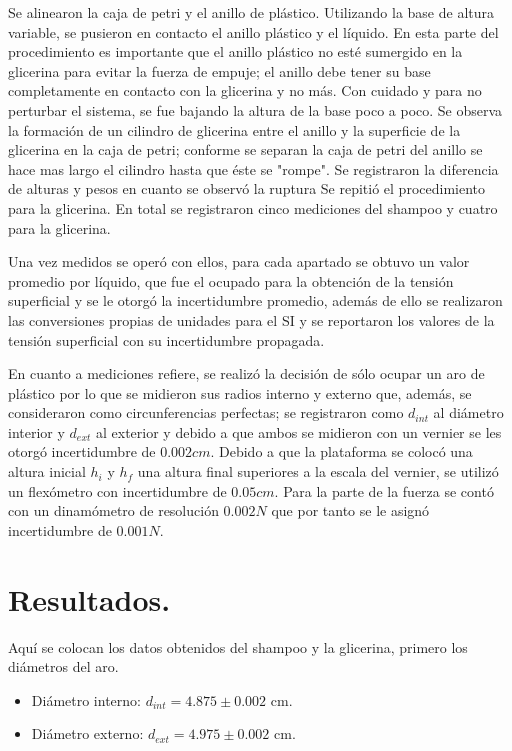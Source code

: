 \documentclass[a4paper]{article}
\begin{document}
Se alinearon la caja de petri y el anillo de plástico. Utilizando la base de altura variable, se pusieron en contacto el anillo plástico y el líquido. En esta parte del procedimiento es importante que el anillo plástico no esté sumergido en la glicerina para evitar la fuerza de empuje; el anillo debe tener su base completamente en contacto con la glicerina y no más. Con cuidado y para no perturbar el sistema, se fue bajando la altura de la base poco a poco. Se observa la formación de un cilindro de glicerina entre el anillo y la superficie de la glicerina en la caja de petri; conforme se separan la caja de petri del anillo se hace mas largo el cilindro hasta que éste se "rompe". Se registraron la diferencia de alturas y pesos en cuanto se observó la ruptura Se repitió el procedimiento para la glicerina. En total se registraron cinco mediciones del shampoo y cuatro para la glicerina.

Una vez medidos se operó con ellos, para cada apartado se obtuvo un valor promedio por líquido, que fue el ocupado para la obtención de la tensión superficial y se le otorgó la incertidumbre promedio, además de ello se realizaron las conversiones propias de unidades para el SI y se reportaron los valores de la tensión superficial con su incertidumbre propagada.

En cuanto a mediciones refiere, se realizó la decisión de sólo ocupar un aro de plástico por lo que se midieron sus radios interno y externo que, además, se consideraron como circunferencias perfectas; se registraron como $d_{int}$ al diámetro interior y $d_{ext}$ al exterior y debido a que ambos se midieron con un vernier se les otorgó incertidumbre de $0.002 cm$. Debido a que la plataforma se colocó una altura inicial $h_i$ y $h_f$ una altura final  superiores a la escala del vernier, se utilizó un flexómetro con incertidumbre de $0.05 cm$. Para la parte de la fuerza se contó con un dinamómetro de resolución $0.002 N$ que por tanto se le asignó incertidumbre de $0.001 N$.

\section*{Resultados.}
Aquí se colocan los datos obtenidos del shampoo y la glicerina, primero los diámetros del aro.

\begin{itemize}
    \item Diámetro interno:  $d_{int} = 4.875\pm0.002$ cm.
    \item Diámetro externo: $d_{ext} = 4.975\pm0.002$ cm.
\end{itemize}
\end{document}
